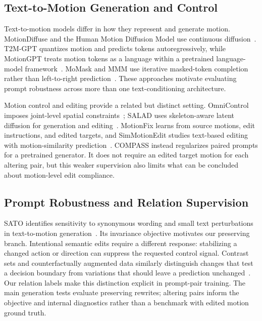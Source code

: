 \subsection{Text-to-Motion Generation and Control}
Text-to-motion models differ in how they represent and generate motion.
MotionDiffuse and the Human Motion Diffusion Model use continuous
 diffusion~\cite{zhang2022motiondiffusetextdrivenhumanmotion,tevet2022humanmotiondiffusionmodel}.
T2M-GPT quantizes motion and predicts tokens autoregressively, while
MotionGPT treats motion tokens as a language within a pretrained
language-model framework~\cite{zhang2023generating,jiang2023motiongpt}.
MoMask and MMM use iterative masked-token completion rather than
left-to-right prediction~\cite{guo2024momask,pinyoanuntapong2024mmmgenerativemaskedmotion}.
These approaches motivate evaluating prompt robustness across more than one
text-conditioning architecture.

Motion control and editing provide a related but distinct setting.
OmniControl imposes joint-level spatial constraints~\cite{xie2024omnicontrol};
SALAD uses skeleton-aware latent diffusion for generation and
editing~\cite{hong2025salad}. MotionFix learns from source motions, edit
instructions, and edited targets, and SimMotionEdit studies text-based editing
with motion-similarity prediction~\cite{athanasiou2024motionfix,li2025simmotionedittextbasedhumanmotion}.
COMPASS instead regularizes paired prompts for a pretrained generator. It does
not require an edited target motion for each altering pair, but this weaker
supervision also limits what can be concluded about motion-level edit
compliance.

\subsection{Prompt Robustness and Relation Supervision}
SATO identifies sensitivity to synonymous wording and small text
perturbations in text-to-motion generation~\cite{chen2024sato}. Its invariance
objective motivates our preserving branch. Intentional semantic edits require
a different response: stabilizing a changed action or direction can suppress
the requested control signal. Contrast sets and counterfactually augmented
data similarly distinguish changes that test a decision boundary from
variations that should leave a prediction
unchanged~\cite{gardner2020evaluatingmodelslocaldecision,kaushik2019learning}.
Our relation labels make this distinction explicit in prompt-pair training.
The main generation tests evaluate preserving rewrites; altering pairs inform
the objective and internal diagnostics rather than a benchmark with edited
motion ground truth.

